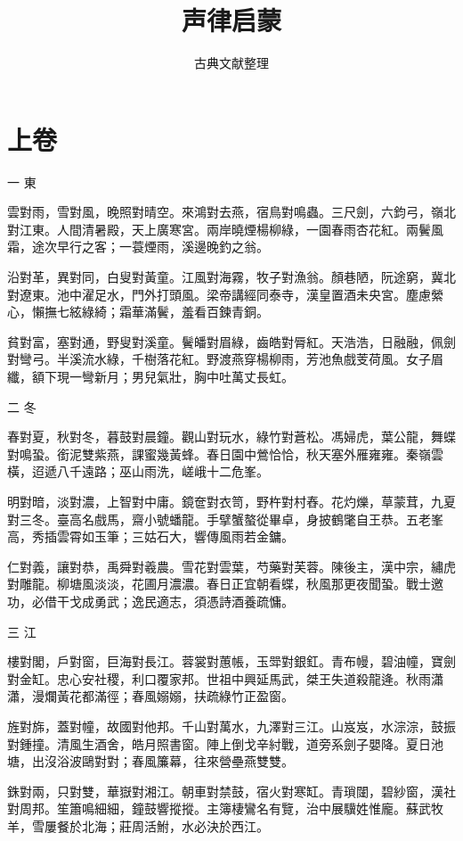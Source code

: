 \documentclass[12pt,a4paper]{ctexbook}
\title{声律启蒙}
\author{古典文献整理}
\date{}
\begin{document}
\maketitle
\tableofcontents
\newpage
\section{上卷}
一 東\par
雲對雨，雪對風，晚照對晴空。來鴻對去燕，宿鳥對鳴蟲。三尺劍，六鈞弓，嶺北對江東。人間清暑殿，天上廣寒宮。兩岸曉煙楊柳綠，一園春雨杏花紅。兩鬢風霜，途次早行之客；一蓑煙雨，溪邊晚釣之翁。\par
沿對革，異對同，白叟對黃童。江風對海霧，牧子對漁翁。顏巷陋，阮途窮，冀北對遼東。池中濯足水，門外打頭風。梁帝講經同泰寺，漢皇置酒未央宮。塵慮縈心，懶撫七絃綠綺；霜華滿鬢，羞看百鍊青銅。\par
貧對富，塞對通，野叟對溪童。鬢皤對眉綠，齒皓對脣紅。天浩浩，日融融，佩劍對彎弓。半溪流水綠，千樹落花紅。野渡燕穿楊柳雨，芳池魚戲芰荷風。女子眉纖，額下現一彎新月；男兒氣壯，胸中吐萬丈長虹。\par
二 冬\par
春對夏，秋對冬，暮鼓對晨鐘。觀山對玩水，綠竹對蒼松。馮婦虎，葉公龍，舞蝶對鳴蛩。銜泥雙紫燕，課蜜幾黃蜂。春日園中鶯恰恰，秋天塞外雁雍雍。秦嶺雲橫，迢遞八千遠路；巫山雨洗，嵯峨十二危峯。\par
明對暗，淡對濃，上智對中庸。鏡奩對衣笥，野杵對村舂。花灼爍，草蒙茸，九夏對三冬。臺高名戲馬，齋小號蟠龍。手擘蟹螯從畢卓，身披鶴氅自王恭。五老峯高，秀插雲霄如玉筆；三姑石大，響傳風雨若金鏞。\par
仁對義，讓對恭，禹舜對羲農。雪花對雲葉，芍藥對芙蓉。陳後主，漢中宗，繡虎對雕龍。柳塘風淡淡，花圃月濃濃。春日正宜朝看蝶，秋風那更夜聞蛩。戰士邀功，必借干戈成勇武；逸民適志，須憑詩酒養疏慵。\par
三 江\par
樓對閣，戶對窗，巨海對長江。蓉裳對蕙帳，玉斝對銀釭。青布幔，碧油幢，寶劍對金缸。忠心安社稷，利口覆家邦。世祖中興延馬武，桀王失道殺龍逄。秋雨瀟瀟，漫爛黃花都滿徑；春風嫋嫋，扶疏綠竹正盈窗。\par
旌對旆，蓋對幢，故國對他邦。千山對萬水，九澤對三江。山岌岌，水淙淙，鼓振對鍾撞。清風生酒舍，皓月照書窗。陣上倒戈辛紂戰，道旁系劍子嬰降。夏日池塘，出沒浴波鷗對對；春風簾幕，往來營壘燕雙雙。\par
銖對兩，只對雙，華嶽對湘江。朝車對禁鼓，宿火對寒缸。青瑣闥，碧紗窗，漢社對周邦。笙簫鳴細細，鐘鼓響摐摐。主簿棲鸞名有覽，治中展驥姓惟龐。蘇武牧羊，雪屢餐於北海；莊周活鮒，水必決於西江。\par
\end{document}
